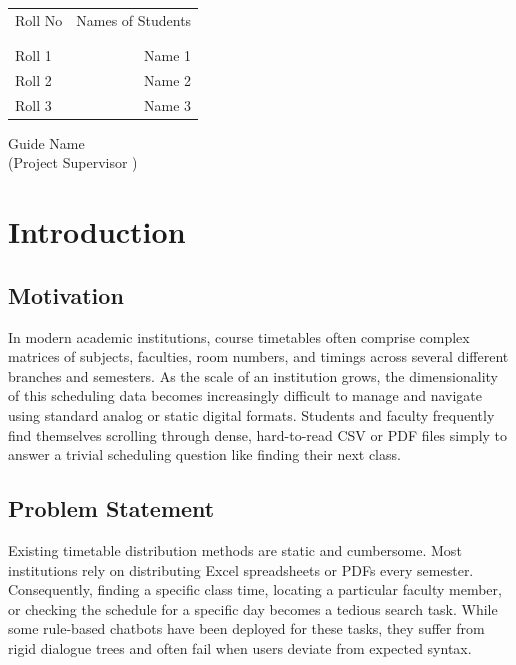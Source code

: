 \documentclass[12pt]{article}
\begin{document}
\begin{table}[h]
	\centering
	\begin{tabular}{lr}
		Roll No & Names of Students \\ \\ \hline
		\\
		Roll 1 & Name 1 \\ 
		Roll 2 & Name 2 \\ 
		Roll 3 & Name 3 \\ 
	\end{tabular}
\end{table}

\vfill

\begin{flushright}
	Guide Name\\
	(Project Supervisor )\\[1.5cm]
\end{flushright}

\newpage
{}
\setcounter{page}{1}
\tableofcontents
\newpage


\newpage
\thispagestyle{empty}
\clearpage             
\thispagestyle{empty}  
\phantom{a}            
\newpage

\section{Introduction}
\subsection{Motivation}
In modern academic institutions, course timetables often comprise complex matrices of subjects, faculties, room numbers, and timings across several different branches and semesters. As the scale of an institution grows, the dimensionality of this scheduling data becomes increasingly difficult to manage and navigate using standard analog or static digital formats. Students and faculty frequently find themselves scrolling through dense, hard-to-read CSV or PDF files simply to answer a trivial scheduling question like finding their next class. 

\subsection{Problem Statement}
Existing timetable distribution methods are static and cumbersome. Most institutions rely on distributing Excel spreadsheets or PDFs every semester. Consequently, finding a specific class time, locating a particular faculty member, or checking the schedule for a specific day becomes a tedious search task. While some rule-based chatbots have been deployed for these tasks, they suffer from rigid dialogue trees and often fail when users deviate from expected syntax.
\end{document}
